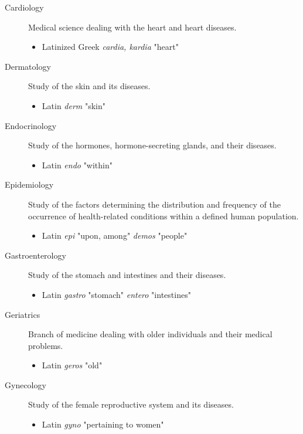 \documentclass[11pt]{article}
\begin{document}
\begin{description}
\item[{Cardiology}] Medical science dealing with the heart and heart diseases.
\begin{itemize}
\item Latinized Greek \emph{cardia, kardia} "heart"
\end{itemize}

\item[{Dermatology}] Study of the skin and its diseases.
\begin{itemize}
\item Latin \emph{derm} "skin"
\end{itemize}

\item[{Endocrinology}] Study of the hormones, hormone-secreting glands, and their
diseases.
\begin{itemize}
\item Latin \emph{endo} "within"
\end{itemize}

\item[{Epidemiology}] Study of the factors determining the distribution and
frequency of the occurrence of health-related conditions within a
defined human population.
\begin{itemize}
\item Latin \emph{epi} "upon, among" \emph{demos} "people"
\end{itemize}

\item[{Gastroenterology}] Study of the stomach and intestines and their diseases.
\begin{itemize}
\item Latin \emph{gastro} "stomach" \emph{entero} "intestines"
\end{itemize}

\item[{Geriatrics}] Branch of medicine dealing with older individuals and their
medical problems.
\begin{itemize}
\item Latin \emph{geros} "old"
\end{itemize}

\item[{Gynecology}] Study of the female reproductive system and its diseases.
\begin{itemize}
\item Latin \emph{gyno} "pertaining to women"
\end{itemize}


\end{description}
\end{document}
